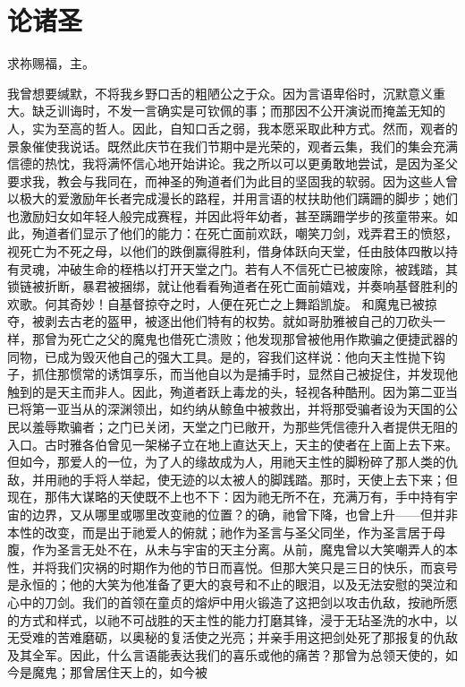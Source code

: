 
\chapter{论诸圣}


求祢赐福，主。\par

我曾想要缄默，不将我乡野口舌的粗陋公之于众。因为言语卑俗时，沉默意义重大。缺乏训诲时，不发一言确实是可钦佩的事；而那因不公开演说而掩盖无知的人，实为至高的哲人。因此，自知口舌之弱，我本愿采取此种方式。然而，观者的景象催使我说话。既然此庆节在我们节期中是光荣的，观者云集，我们的集会充满信德的热忱，我将满怀信心地开始讲论。我之所以可以更勇敢地尝试，是因为圣父要求我，教会与我同在，而神圣的殉道者们为此目的坚固我的软弱。因为这些人曾以极大的爱激励年长者完成漫长的路程，并用言语的杖扶助他们蹒跚的脚步；她们也激励妇女如年轻人般完成赛程，并因此将年幼者，甚至蹒跚学步的孩童带来。如此，殉道者们显示了他们的能力：在死亡面前欢跃，嘲笑刀剑，戏弄君王的愤怒，视死亡为不死之母，以他们的跌倒赢得胜利，借身体跃向天堂，任由肢体四散以持有灵魂，冲破生命的桎梏以打开天堂之门。若有人不信死亡已被废除，被践踏，其锁链被折断，暴君被捆绑，就让他看看殉道者在死亡面前嬉戏，并奏响基督胜利的欢歌。何其奇妙！自基督掠夺之时，人便在死亡之上舞蹈凯旋。 和魔鬼已被掠夺，被剥去古老的盔甲，被逐出他们特有的权势。就如哥肋雅被自己的刀砍头一样，那曾为死亡之父的魔鬼也借死亡溃败；他发现那曾被他用作欺骗之便捷武器的同物，已成为毁灭他自己的强大工具。是的，容我们这样说：他向天主性抛下钩子，抓住那惯常的诱饵享乐，而当他自以为是捕手时，显然自己被捉住，并发现他触到的是天主而非人。因此，殉道者跃上毒龙的头，轻视各种酷刑。因为第二亚当已将第一亚当从的深渊领出，如约纳从鲸鱼中被救出，并将那受骗者设为天国的公民以羞辱欺骗者；之门已关闭，天堂之门已敞开，为那些凭信德升入者提供无阻的入口。古时雅各伯曾见一架梯子立在地上直达天上，天主的使者在上面上去下来。但如今，那爱人的一位，为了人的缘故成为人，用祂天主性的脚粉碎了那人类的仇敌，并用祂的手将人举起，使无迹的以太被人的脚践踏。那时，天使上去下来；但现在，那伟大谋略的天使既不上也不下：因为祂无所不在，充满万有，手中持有宇宙的边界，又从哪里或哪里改变祂的位置？的确，祂曾下降，也曾上升——但并非本性的改变，而是出于祂爱人的俯就；祂作为圣言与圣父同坐，作为圣言居于母腹，作为圣言无处不在，从未与宇宙的天主分离。从前，魔鬼曾以大笑嘲弄人的本性，并将我们灾祸的时期作为他的节日而喜悦。但那大笑只是三日的快乐，而哀号是永恒的；他的大笑为他准备了更大的哀号和不止的眼泪，以及无法安慰的哭泣和心中的刀剑。我们的首领在童贞的熔炉中用火锻造了这把剑以攻击仇敌，按祂所愿的方式和样式，以祂不可战胜的天主性的能力打磨其锋，浸于无玷圣洗的水中，以无受难的苦难磨砺，以奥秘的复活使之光亮；并亲手用这把剑处死了那报复的仇敌及其全军。因此，什么言语能表达我们的喜乐或他的痛苦？那曾为总领天使的，如今是魔鬼；那曾居住天上的，如今被